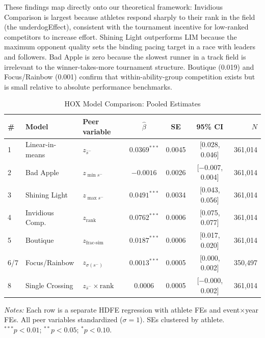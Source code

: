 \documentclass[12pt]{article}
\theoremstyle{definition}
\theoremstyle{remark}
\begin{document}
These findings map directly onto our theoretical framework:
Invidious Comparison is largest because athletes respond sharply to their rank
in the field (the underdogEffect), consistent with the tournament incentive for
low-ranked competitors to increase effort.
Shining Light outperforms LIM because the maximum opponent quality sets the
binding pacing target in a race with leaders and followers.
Bad Apple is zero because the slowest runner in a track field is irrelevant
to the winner-takes-more tournament structure.
Boutique (0.019) and Focus/Rainbow (0.001) confirm that within-ability-group
competition exists but is small relative to absolute performance benchmarks.

\begin{table}[H]
\centering
\begin{threeparttable}
\caption{HOX Model Comparison: Pooled Estimates}
\label{tab:hox_models}
\begin{tabular}{lllcccr}
\toprule
\# & Model & Peer variable & $\hat\beta$ & SE & 95\% CI & $N$ \\
\midrule
1 & Linear-in-means  & $z_{\bar{s}^-}$         & $0.0369^{***}$ & 0.0045 & [0.028, 0.046] & 361,014 \\
2 & Bad Apple        & $z_{\min s^-}$           & $-0.0016$      & 0.0026 & [$-$0.007, 0.004] & 361,014 \\
3 & Shining Light    & $z_{\max s^-}$           & $0.0491^{***}$ & 0.0034 & [0.043, 0.056] & 361,014 \\
4 & Invidious Comp.  & $z_{\text{rank}}$        & $0.0762^{***}$ & 0.0006 & [0.075, 0.077] & 361,014 \\
5 & Boutique         & $z_{\text{frac-sim}}$    & $0.0187^{***}$ & 0.0006 & [0.017, 0.020] & 361,014 \\
6/7 & Focus/Rainbow  & $z_{\sigma(s^-)}$        & $0.0013^{***}$ & 0.0005 & [0.000, 0.002] & 350,497 \\
8 & Single Crossing  & $z_{\bar{s}^-}\times\text{rank}$ & $0.0006$ & 0.0005 & [$-$0.000, 0.002] & 361,014 \\
\bottomrule
\end{tabular}
\begin{tablenotes}\small
\item \textit{Notes:} Each row is a separate HDFE regression with athlete FEs and event$\times$year FEs.
All peer variables standardized ($\sigma=1$). SEs clustered by athlete.
$^{***}p<0.01$; $^{**}p<0.05$; $^{*}p<0.10$.
\end{tablenotes}
\end{threeparttable}
\end{table}
\end{document}
